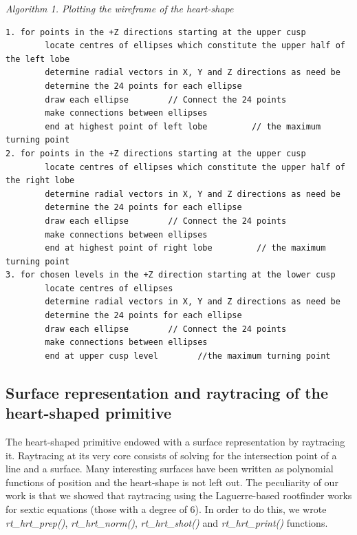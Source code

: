 \hspace{50} \textit{Algorithm 1. Plotting the wireframe of the heart­-shape }
\footnotesize{\begin{verbatim}
1. for points in the +Z directions starting at the upper cusp 
        locate centres of ellipses which constitute the upper half of the left lobe 
        determine radial vectors in X, Y and Z directions as need be 
        determine the 24 points for each ellipse 
        draw each ellipse        // Connect the 24 points 
        make connections between ellipses 
        end at highest point of left lobe         // the maximum turning point 
2. for points in the +Z directions starting at the upper cusp 
        locate centres of ellipses which constitute the upper half of the right lobe 
        determine radial vectors in X, Y and Z directions as need be 
        determine the 24 points for each ellipse 
        draw each ellipse        // Connect the 24 points 
        make connections between ellipses 
        end at highest point of right lobe         // the maximum turning point   
3. for chosen levels in the +Z direction starting at the lower cusp 
        locate centres of ellipses 
        determine radial vectors in X, Y and Z directions as need be 
        determine the 24 points for each ellipse 
        draw each ellipse        // Connect the 24 points 
        make connections between ellipses
        end at upper cusp level        //the maximum turning point 
\end{verbatim}}

\normalsize

\subsection{Surface   representation   and   raytracing   of   the   heart­-shaped primitive}

\hspace{30} The   heart-­shaped   primitive   endowed   with   a   surface   representation   by  
raytracing   it.   Ray­tracing   at   its   very   core   consists   of   solving   for   the   intersection  
point   of   a   line   and   a   surface.   Many   interesting   surfaces   have   been   written   as  
polynomial   functions   of   position   and   the   heart­-shape   is   not   left   out.   The  
peculiarity   of   our   work   is   that   we   showed   that   ray­tracing   using   the  
Laguerre­-based   root­finder   works   for   sextic   equations   (those   with   a   degree   of  
6).   In   order   to   do   this,   we   wrote   \textit{rt\_hrt\_prep()},   \textit{rt\_hrt\_norm()},   \textit{rt\_hrt\_shot()}   and  
\textit{rt\_hrt\_print()} functions.

